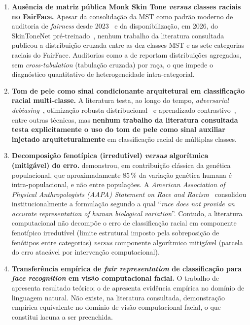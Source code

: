 \begin{enumerate}[label=\textbf{Lacuna \arabic*}.]
\item \textbf{Ausência de matriz pública Monk Skin Tone \emph{versus} classes raciais no FairFace.} Apesar da consolidação da MST como padrão moderno de auditoria de \emph{fairness} desde 2023~\cite{schumann2023consensus} e da disponibilização, em 2026, do SkinToneNet pré-treinado~\cite{matias2026large}, nenhum trabalho da literatura consultada publicou a distribuição cruzada entre as dez classes MST e as sete categorias raciais do FairFace. Auditorias como a de  reportam distribuições agregadas, sem \emph{cross-tabulation} (tabulação cruzada) por raça, o que impede o diagnóstico quantitativo de heterogeneidade intra-categorial.

\item \textbf{Tom de pele como sinal condicionante arquitetural em classificação racial multi-classe.} A literatura testa, ao longo do tempo, \emph{adversarial debiasing}~\cite{zhang2018mitigating}, otimização robusta distribucional~\cite{sagawa2020distribution} e aprendizado contrastivo~\cite{park2022fair}, entre outras técnicas, mas \textbf{nenhum trabalho da literatura consultada testa explicitamente o uso do tom de pele como sinal auxiliar injetado arquiteturalmente} em classificação racial de múltiplas classes.

\item \textbf{Decomposição fenotípica (irredutível) \emph{versus} algorítmica (mitigável) do erro.}  demonstrou, em contribuição clássica da genética populacional, que aproximadamente 85\,\% da variação genética humana é intra-populacional, e não entre populações. A \emph{American Association of Physical Anthropologists (AAPA) Statement on Race and Racism}~\cite{fuentes2019aapa} consolidou institucionalmente a formulação segundo a qual ``\emph{race does not provide an accurate representation of human biological variation}''. Contudo, a literatura computacional não decompõe o erro de classificação racial em componente fenotípico irredutível (limite estrutural imposto pela sobreposição de fenótipos entre categorias) \emph{versus} componente algorítmico mitigável (parcela do erro atacável por intervenção computacional).

\item \textbf{Transferência empírica de \emph{fair representation} de classificação para \emph{face recognition} em visão computacional facial.} O trabalho de  apresenta resultado teórico; o de  apresenta evidência empírica no domínio de linguagem natural. Não existe, na literatura consultada, demonstração empírica equivalente no domínio de visão computacional facial, o que constitui lacuna a ser preenchida.


\end{enumerate}
